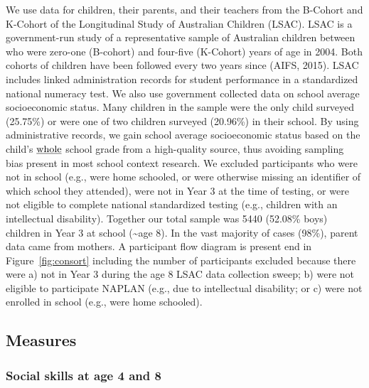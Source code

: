 \documentclass[
  english,
  man]{apa6}
\begin{document}
We use data for children, their parents, and their teachers from the B-Cohort and K-Cohort of the Longitudinal Study of Australian Children (LSAC). LSAC is a government-run study of a representative sample of Australian children between who were zero-one (B-cohort) and four-five (K-Cohort) years of age in 2004. Both cohorts of children have been followed every two years since (AIFS, 2015). LSAC includes linked administration records for student performance in a standardized national numeracy test. We also use government collected data on school average socioeconomic status. Many children in the sample were the only child surveyed (25.75\%) or were one of two children surveyed (20.96\%) in their school. By using administrative records, we gain school average socioeconomic status based on the child's \(\text{\underline{whole}}\) school grade from a high-quality source, thus avoiding sampling bias present in most school context research. We excluded participants who were not in school (e.g., were home schooled, or were otherwise missing an identifier of which school they attended), were not in Year 3 at the time of testing, or were not eligible to complete national standardized testing (e.g., children with an intellectual disability). Together our total sample was 5440 (52.08\% boys) children in Year 3 at school (\textasciitilde age 8). In the vast majority of cases (98\%), parent data came from mothers. A participant flow diagram is present end in Figure~\ref{fig:consort} including the number of participants excluded because there were a) not in Year 3 during the age 8 LSAC data collection sweep; b) were not eligible to participate NAPLAN (e.g., due to intellectual disability; or c) were not enrolled in school (e.g., were home schooled).

\hypertarget{measures}{%
\subsection{Measures}\label{measures}}

\hypertarget{social-skills-at-age-4-and-8}{%
\subsubsection{Social skills at age 4 and 8}\label{social-skills-at-age-4-and-8}}
\end{document}
